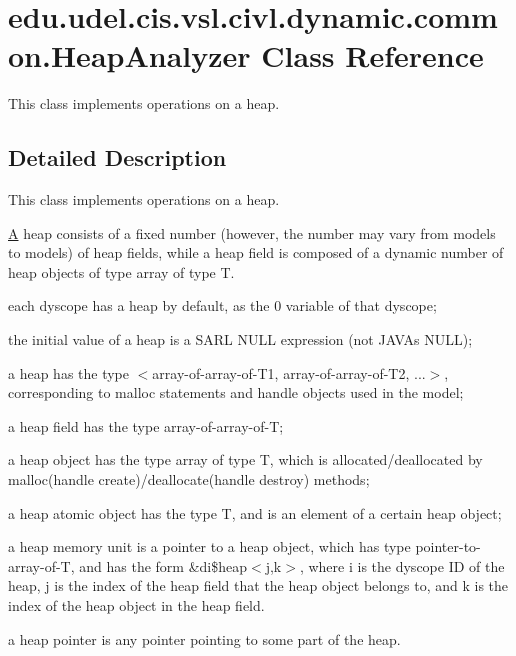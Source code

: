 \hypertarget{classedu_1_1udel_1_1cis_1_1vsl_1_1civl_1_1dynamic_1_1common_1_1HeapAnalyzer}{}\section{edu.\+udel.\+cis.\+vsl.\+civl.\+dynamic.\+common.\+Heap\+Analyzer Class Reference}
\label{classedu_1_1udel_1_1cis_1_1vsl_1_1civl_1_1dynamic_1_1common_1_1HeapAnalyzer}


This class implements operations on a heap.  




\subsection{Detailed Description}
This class implements operations on a heap. 

\hyperlink{structA}{A} heap consists of a fixed number (however, the number may vary from models to models) of heap fields, while a heap field is composed of a dynamic number of heap objects of type array of type T. 
\begin{DoxyItemize}
\item each dyscope has a heap by default, as the 0 variable of that dyscope; 
\item the initial value of a heap is a S\+A\+R\+L N\+U\+L\+L expression (not J\+A\+V\+A\textquotesingle{}s N\+U\+L\+L); 
\item a heap has the type $<$array-\/of-\/array-\/of-\/\+T1, array-\/of-\/array-\/of-\/\+T2, ...$>$, corresponding to malloc statements and handle objects used in the model; 
\item a heap field has the type array-\/of-\/array-\/of-\/\+T; 
\item a heap object has the type array of type T, which is allocated/deallocated by malloc(handle create)/deallocate(handle destroy) methods; 
\item a heap atomic object has the type T, and is an element of a certain heap object; 
\item a heap memory unit is a pointer to a heap object, which has type pointer-\/to-\/array-\/of-\/\+T, and has the form {\ttfamily \&di\$heap$<$j,k$>$}, where {\ttfamily i} is the dyscope I\+D of the heap, {\ttfamily j} is the index of the heap field that the heap object belongs to, and {\ttfamily k} is the index of the heap object in the heap field. 
\item a heap pointer is any pointer pointing to some part of the heap. 
\end{DoxyItemize}

